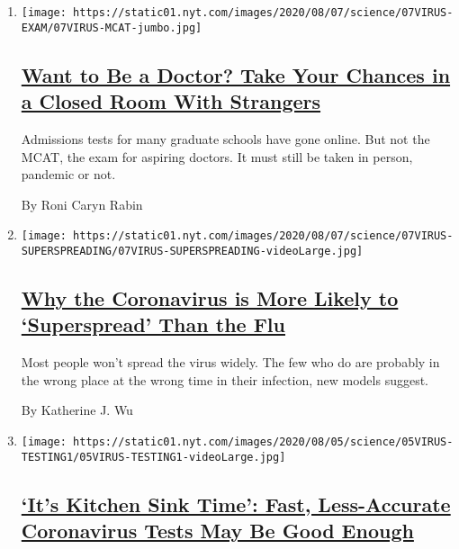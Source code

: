 \begin{enumerate}
\def\labelenumi{\arabic{enumi}.}
\item
  \texttt{[image: https://static01.nyt.com/images/2020/08/07/science/07VIRUS-EXAM/07VIRUS-MCAT-jumbo.jpg]}

  \hypertarget{want-to-be-a-doctor-take-your-chances-in-a-closed-room-with-strangers}{%
  \subsection{\texorpdfstring{\href{/2020/08/07/health/coronavirus-exams-mcat.html}{Want
  to Be a Doctor? Take Your Chances in a Closed Room With
  Strangers}}{Want to Be a Doctor? Take Your Chances in a Closed Room With Strangers}}\label{want-to-be-a-doctor-take-your-chances-in-a-closed-room-with-strangers}}

  Admissions tests for many graduate schools have gone online. But not
  the MCAT, the exam for aspiring doctors. It must still be taken in
  person, pandemic or not.

  By Roni Caryn Rabin
\item
  \texttt{[image: https://static01.nyt.com/images/2020/08/07/science/07VIRUS-SUPERSPREADING/07VIRUS-SUPERSPREADING-videoLarge.jpg]}

  \hypertarget{why-the-coronavirus-is-more-likely-to-superspread-than-the-flu}{%
  \subsection{\texorpdfstring{\href{/2020/08/07/health/coronavirus-superspreading-contagion.html}{Why
  the Coronavirus is More Likely to `Superspread' Than the
  Flu}}{Why the Coronavirus is More Likely to `Superspread' Than the Flu}}\label{why-the-coronavirus-is-more-likely-to-superspread-than-the-flu}}

  Most people won't spread the virus widely. The few who do are probably
  in the wrong place at the wrong time in their infection, new models
  suggest.

  By Katherine J. Wu
\item
  \texttt{[image: https://static01.nyt.com/images/2020/08/05/science/05VIRUS-TESTING1/05VIRUS-TESTING1-videoLarge.jpg]}

  \hypertarget{its-kitchen-sink-time-fast-less-accurate-coronavirus-tests-may-be-good-enough}{%
  \subsection{\texorpdfstring{\href{/2020/08/06/health/rapid-Covid-tests.html}{`It's
  Kitchen Sink Time': Fast, Less-Accurate Coronavirus Tests May Be Good
  Enough}}{`It's Kitchen Sink Time': Fast, Less-Accurate Coronavirus Tests May Be Good Enough}}\label{its-kitchen-sink-time-fast-less-accurate-coronavirus-tests-may-be-good-enough}}


\end{enumerate}
